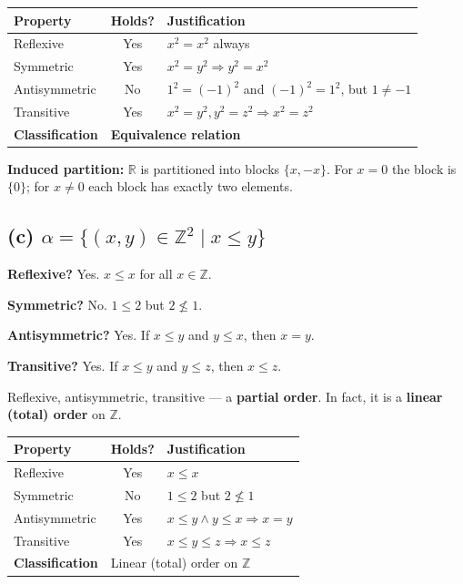 \documentclass[12pt, a4paper]{article}
\newcommand{\Z}{\mathbb{Z}}
\newcommand{\R}{\mathbb{R}}
\begin{document}
\begin{center}
\renewcommand{\arraystretch}{1.15}
\begin{tabular}{l|c|l}
  \toprule
  \textbf{Property} & \textbf{Holds?} & \textbf{Justification} \\
  \midrule
  Reflexive      & Yes & $x^2 = x^2$ always \\
  Symmetric      & Yes & $x^2=y^2 \Rightarrow y^2=x^2$ \\
  Antisymmetric  & No  & $1^2=(-1)^2$ and $(-1)^2=1^2$, but $1\ne -1$ \\
  Transitive     & Yes & $x^2=y^2, y^2=z^2 \Rightarrow x^2=z^2$ \\
  \midrule
  \textbf{Classification} & \multicolumn{2}{l}{\textbf{Equivalence relation}} \\
  \bottomrule
\end{tabular}
\end{center}

\smallskip
\textbf{Induced partition:}\; $\R$ is partitioned into blocks $\{x,-x\}$.  For $x=0$ the block is $\{0\}$; for $x\ne 0$ each block has exactly two elements.

\subsection*{(c)\; $\alpha = \{(x,y) \in \Z^2 \mid x \le y\}$}

\textbf{Reflexive?} Yes.  $x \le x$ for all $x \in \Z$. \checkmark

\textbf{Symmetric?} No.  $1 \le 2$ but $2 \nleq 1$.

\textbf{Antisymmetric?} Yes.  If $x \le y$ and $y \le x$, then $x=y$. \checkmark

\textbf{Transitive?} Yes.  If $x \le y$ and $y \le z$, then $x \le z$. \checkmark

\begin{answerbox}
Reflexive, antisymmetric, transitive --- a \textbf{partial order}. In fact, it is a \textbf{linear (total) order} on $\Z$.
\end{answerbox}

\begin{center}
\renewcommand{\arraystretch}{1.15}
\begin{tabular}{l|c|l}
  \toprule
  \textbf{Property} & \textbf{Holds?} & \textbf{Justification} \\
  \midrule
  Reflexive      & Yes & $x \le x$ \\
  Symmetric      & No  & $1\le 2$ but $2\nleq 1$ \\
  Antisymmetric  & Yes & $x\le y\land y\le x \Rightarrow x=y$ \\
  Transitive     & Yes & $x\le y\le z \Rightarrow x\le z$ \\
  \midrule
  \textbf{Classification} & \multicolumn{2}{l}{Linear (total) order on $\Z$} \\
  \bottomrule
\end{tabular}
\end{center}
\end{document}
